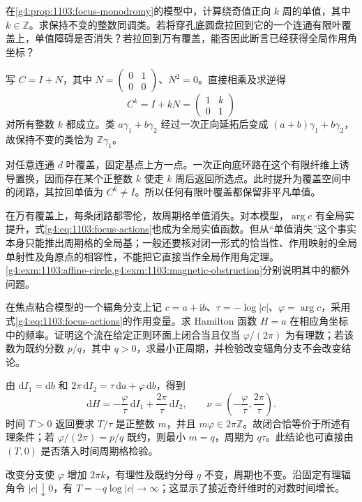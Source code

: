 \begin{exercise}\label{g4:ex:1103:monodromy-cover}
	在\cref{g4:prop:1103:focus-monodromy}的模型中，计算绕奇值正向 \(k\) 周的单值，其中 \(k\in\mathbb Z\)。求保持不变的整数同调类。若将穿孔底圆盘拉回到它的一个连通有限叶覆盖上，单值障碍是否消失？若拉回到万有覆盖，能否因此断言已经获得全局作用角坐标？
\end{exercise}
\begin{solution}
	写 \(C=I+N\)，其中 \(N=\left(\begin{smallmatrix}0&1\\0&0\end{smallmatrix}\right)\)、\(N^2=0\)。直接相乘及求逆得
	\[
		C^k=I+kN=\begin{pmatrix}1&k\\0&1\end{pmatrix}
	\]
	对所有整数 \(k\) 都成立。类 \(a\gamma_1+b\gamma_2\) 经过一次正向延拓后变成 \((a+b)\gamma_1+b\gamma_2\)，故保持不变的类恰为 \(\mathbb Z\gamma_1\)。

	对任意连通 \(d\) 叶覆盖，固定基点上方一点。一次正向底环路在这个有限纤维上诱导置换，因而存在某个正整数 \(k\) 使走 \(k\) 周后返回所选点。此时提升为覆盖空间中的闭路，其拉回单值为 \(C^k\ne I\)。所以任何有限叶覆盖都保留非平凡单值。

	在万有覆盖上，每条闭路都零伦，故周期格单值消失。对本模型，\(\arg c\) 有全局实提升，式\eqref{g4:eq:1103:focus-actions}也成为全局实值函数。但从“单值消失”这个事实本身只能推出周期格的全局基；一般还要核对闭一形式的恰当性、作用映射的全局单射性及角原点的相容性，不能把它直接当作全局作用角定理。\cref{g4:exm:1103:affine-circle,g4:exm:1103:magnetic-obstruction}分别说明其中的额外问题。
\end{solution}

\begin{exercise}\label{g4:ex:1103:focus-frequency}
	在焦点粘合模型的一个辐角分支上记 \(c=a+\mathrm{i}b\)、\(\tau=-\log|c|\)、\(\varphi=\arg c\)，采用式\eqref{g4:eq:1103:focus-actions}的作用变量。求 Hamilton 函数 \(H=a\) 在相应角坐标中的频率。证明这个流在给定正则环面上闭合当且仅当 \(\varphi/(2\pi)\) 为有理数；若该数为既约分数 \(p/q\)，其中 \(q>0\)，求最小正周期，并检验改变辐角分支不会改变结论。
\end{exercise}
\begin{solution}
	由 \(\mathrm{d}I_1=\mathrm{d}b\) 和 \(2\pi\,\mathrm{d}I_2=\tau\,\mathrm{d}a+\varphi\,\mathrm{d}b\)，得到
	\[
		\mathrm{d}H=-\frac{\varphi}{\tau}\,\mathrm{d}I_1
		+\frac{2\pi}{\tau}\,\mathrm{d}I_2,
		\qquad \nu=\left(-\frac{\varphi}{\tau},\frac{2\pi}{\tau}\right).
	\]
	时间 \(T>0\) 返回要求 \(T/\tau\) 是正整数 \(m\)，并且 \(m\varphi\in2\pi\mathbb Z\)。故闭合恰等价于所述有理条件；若 \(\varphi/(2\pi)=p/q\) 既约，则最小 \(m=q\)，周期为 \(q\tau\)。此结论也可直接由 \((T,0)\) 是否落入时间周期格检验。

	改变分支使 \(\varphi\) 增加 \(2\pi k\)，有理性及既约分母 \(q\) 不变，周期也不变。沿固定有理辐角令 \(|c|\downarrow0\)，有 \(T=-q\log|c|\to\infty\)；这显示了接近奇纤维时的对数时间增长。
\end{solution}

